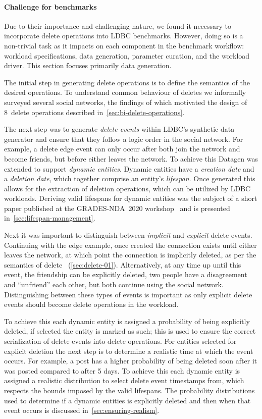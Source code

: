 \paragraph{Challenge for benchmarks}
Due to their importance and challenging nature, we found it necessary to incorporate delete operations into LDBC benchmarks.
However, doing so is a non-trivial task as it impacts on each component in the benchmark workflow:
workload specifications, data generation, parameter curation, and the workload driver.
This section focuses primarily data generation.

The initial step in generating delete operations is to define the semantics of the desired operations.
To understand common behaviour of deletes we informally surveyed several social networks, the findings of which motivated the design
of 8~delete operations described in~\autoref{sec:bi-delete-operations}.

The next step was to generate \emph{delete events} within LDBC's synthetic data generator and ensure that they follow a logic order in
the social network.
For example, a delete \tKnows edge event can only occur after both \tPersons join the network and become friends,
but before either \tPerson leaves the network.
To achieve this Datagen was extended to support \emph{dynamic entities}.
Dynamic entities have a \emph{creation date} and a \emph{deletion date}, which together comprise an entity's \emph{lifespan}.
Once generated this allows for the extraction of deletion operations, which can be utilized by LDBC workloads.
Deriving valid lifespans for dynamic entities was the subject of a short paper published at the GRADES-NDA~2020
workshop~\cite{DBLP:conf/sigmod/WaudbySPS20} and is presented in~\autoref{sec:lifespan-management}.

Next it was important to distinguish between \emph{implicit} and \emph{explicit} delete events.
Continuing with the \tKnows edge example, once created the connection exists until either \tPerson leaves the network,
at which point the connection is implicitly deleted, as per the semantics of delete \tPerson~(\autoref{sec:delete-01}).
Alternatively, at any time up until this event, the friendship can be explicitly deleted,
\ie two people have a disagreement and ``unfriend'' each other, but both continue using the social network.
Distinguishing between these types of events is important as only explicit delete events should become delete operations
in the workload.

To achieve this each dynamic entity is assigned a probability of being explicitly deleted, if selected the entity is marked as such;
this is used to ensure the correct serialization of delete events into delete operations.
For entities selected for explicit deletion the next step is to determine a realistic time at which the event occurs.
For example, a post has a higher probability of being deleted soon after it was posted compared to after 5 days.
To achieve this each dynamic entity is assigned a realistic distribution to select delete event timestamps from,
which respects the bounds imposed by the valid lifespans.
The probability distributions used to determine if a dynamic entities is explicitly deleted and then when that event occurs is discussed
in~\autoref{sec:ensuring-realism}.

